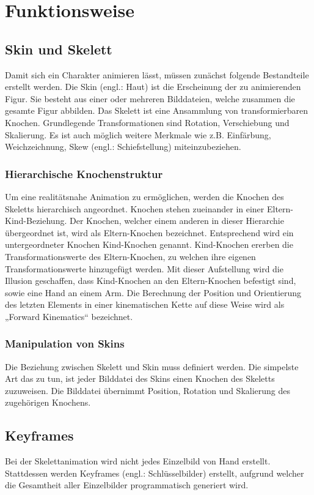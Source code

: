%
%
%
\chapter{Funktionsweise}
\label{cha:funktionsweise}
%
%
\section{Skin und Skelett}
\label{sec:skin_und_skelett}
%
Damit sich ein Charakter animieren lässt, müssen zunächst folgende Bestandteile erstellt werden. Die Skin (engl.: Haut) ist die Erscheinung der zu animierenden Figur. Sie besteht aus einer oder mehreren Bilddateien, welche zusammen die gesamte Figur abbilden.
Das Skelett ist eine Ansammlung von transformierbaren Knochen. Grundlegende Transformationen sind Rotation, Verschiebung und Skalierung. Es ist auch möglich weitere Merkmale wie z.B. Einfärbung, Weichzeichnung, Skew (engl.: Schiefstellung) miteinzubeziehen.
\subsection{Hierarchische Knochenstruktur}
Um eine realitätsnahe Animation zu ermöglichen, werden die Knochen des Skeletts hierarchisch angeordnet. Knochen stehen zueinander in einer Eltern-Kind-Beziehung. Der Knochen, welcher einem anderen in dieser Hierarchie übergeordnet ist, wird als Eltern-Knochen bezeichnet. Entsprechend wird ein untergeordneter Knochen Kind-Knochen genannt. Kind-Knochen ererben die Transformationswerte des Eltern-Knochen, zu welchen ihre eigenen Transformationswerte hinzugefügt werden. Mit dieser Aufstellung wird die Illusion geschaffen, dass Kind-Knochen an den Eltern-Knochen befestigt sind, sowie eine Hand an einem Arm. Die Berechnung der Position und Orientierung des letzten Elements in einer kinematischen Kette auf diese Weise wird als „Forward Kinematics“ bezeichnet.
\subsection{Manipulation von Skins}
Die Beziehung zwischen Skelett und Skin muss definiert werden. Die simpelste Art das zu tun, ist jeder Bilddatei des Skins einen Knochen des Skeletts zuzuweisen. Die Bilddatei übernimmt Position, Rotation und Skalierung des zugehörigen Knochens.
\section{Keyframes}
\label{sec:keyframes}
%
Bei der Skelettanimation wird nicht jedes Einzelbild von Hand erstellt. Stattdessen werden Keyframes (engl.: Schlüsselbilder) erstellt, aufgrund welcher die Gesamtheit aller Einzelbilder programmatisch generiert wird.
%
